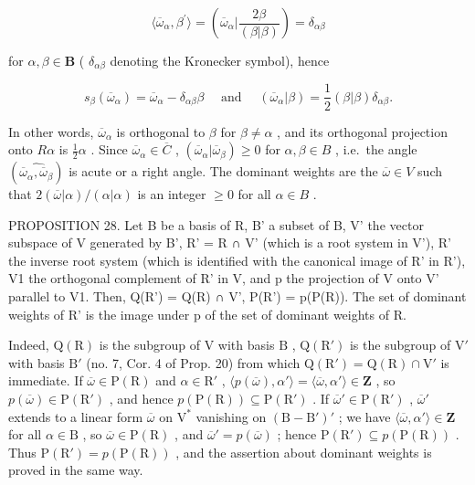 \[
\langle \overline {{{{\omega}}}} _ {\alpha}, \beta^ {\prime} \rangle = (\overline {{{{\omega}}}} _ {\alpha} | \frac {2 \beta}{(\beta | \beta)}) = \delta_ {\alpha \beta}
\]

for \(\alpha, \beta \in \mathbf{B}\) ( \(\delta_{\alpha\beta}\) denoting the Kronecker symbol), hence

\[
s _ {\beta} (\overline {{\omega}} _ {\alpha}) = \overline {{\omega}} _ {\alpha} - \delta_ {\alpha \beta} \beta \quad \text { and } \quad (\overline {{\omega}} _ {\alpha} | \beta) = \frac {1}{2} (\beta | \beta) \delta_ {\alpha \beta}.
\]

In other words, \(\overline{\omega}_{\alpha}\) is orthogonal to \(\beta\) for \(\beta \neq \alpha\) , and its orthogonal projection onto \(R\alpha\) is \(\frac{1}{2}\alpha\) . Since \(\overline{\omega}_{\alpha} \in \overline{C}\) , \((\overline{\omega}_{\alpha} | \overline{\omega}_{\beta}) \geqslant 0\) for \(\alpha, \beta \in B\) , i.e.~the angle \((\widehat{\overline{\omega}_{\alpha}, \overline{\omega}_{\beta}})\) is acute or a right angle. The dominant weights are the \(\overline{\omega} \in V\) such that \(2(\overline{\omega} | \alpha)/( \alpha | \alpha)\) is an integer \(\geqslant 0\) for all \(\alpha \in B\) .

PROPOSITION 28. Let B be a basis of R, B' a subset of B, V' the vector subspace of V generated by B', R' = R ∩ V' (which is a root system in V'), R' the inverse root system (which is identified with the canonical image of R' in R'), V1 the orthogonal complement of R' in V, and p the projection of V onto V' parallel to V1. Then, Q(R') = Q(R) ∩ V', P(R') = p(P(R)). The set of dominant weights of R' is the image under p of the set of dominant weights of R.

Indeed, \(\mathrm{Q}(\mathrm{R})\) is the subgroup of \(\mathrm{V}\) with basis \(\mathrm{B}\) , \(\mathrm{Q}(\mathrm{R}')\) is the subgroup of \(\mathrm{V}'\) with basis \(\mathrm{B}'\) (no. 7, Cor. 4 of Prop. 20) from which \(\mathrm{Q}(\mathrm{R}') = \mathrm{Q}(\mathrm{R}) \cap \mathrm{V}'\) is immediate. If \(\overline{\omega} \in \mathrm{P}(\mathrm{R})\) and \(\alpha \in \mathrm{R}'\) , \(\langle p(\overline{\omega}), \alpha' \rangle = \langle \overline{\omega}, \alpha' \rangle \in \mathbf{Z}\) , so \(p(\overline{\omega}) \in \mathrm{P}(\mathrm{R}')\) , and hence \(p(\mathrm{P}(\mathrm{R})) \subseteq \mathrm{P}(\mathrm{R}')\) . If \(\overline{\omega}' \in \mathrm{P}(\mathrm{R}')\) , \(\overline{\omega}'\) extends to a linear form \(\overline{\omega}\) on \(\mathrm{V}^*\) vanishing on \((\mathrm{B} - \mathrm{B}')'\) ; we have \(\langle \overline{\omega}, \alpha' \rangle \in \mathbf{Z}\) for all \(\alpha \in \mathrm{B}\) , so \(\overline{\omega} \in \mathrm{P}(\mathrm{R})\) , and \(\overline{\omega}' = p(\overline{\omega})\) ; hence \(\mathrm{P}(\mathrm{R}') \subseteq p(\mathrm{P}(\mathrm{R}))\) . Thus \(\mathrm{P}(\mathrm{R}') = p(\mathrm{P}(\mathrm{R}))\) , and the assertion about dominant weights is proved in the same way.

